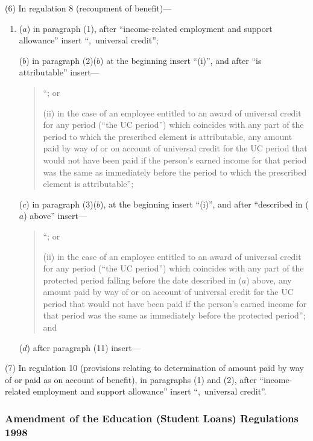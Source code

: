 \documentclass[12pt,a4paper]{article}
\begin{document}
(6) In regulation 8 (recoupment of benefit)—
\begin{enumerate}\item[]
($a$) in paragraph (1), after “income-related employment and support allowance” insert “,~universal credit”;

($b$) in paragraph (2)($b$)  at the beginning insert “(i)”, and after “is attributable” insert—
\begin{quotation}
“; or

(ii) in the case of an employee entitled to an award of universal credit for any period (“the UC period”) which coincides with any part of the period to which the prescribed element is attributable, any amount paid by way of or on account of universal credit for the UC period that would not have been paid if the person’s earned income for that period was the same as immediately before the period to which the prescribed element is attributable”;
\end{quotation}

($c$) in paragraph (3)($b$), at the beginning insert “(i)”, and after “described in ($a$)  above” insert—
\begin{quotation}
“; or

(ii) in the case of an employee entitled to an award of universal credit for any period (“the UC period”) which coincides with any part of the protected period falling before the date described in ($a$)  above, any amount paid by way of or on account of universal credit for the UC period that would not have been paid if the person’s earned income for that period was the same as immediately before the protected period”; and
\end{quotation}

($d$) after paragraph (11) insert—
\begin{quotation}
\begin{sloppypar}
\end{sloppypar}
\end{quotation}
\end{enumerate}

(7) In regulation 10 (provisions relating to determination of amount paid by way of or paid as on account of benefit), in paragraphs (1) and (2), after “income-related employment and support allowance” insert “,~universal credit”.

\subsubsection[51. Amendment of the Education (Student Loans) Regulations 1998]{Amendment of the Education (Student Loans) Regulations 1998}
\end{document}
